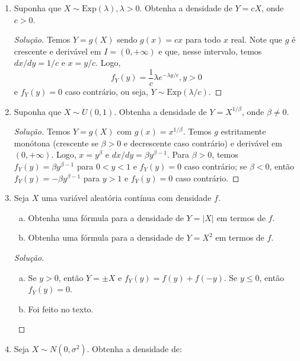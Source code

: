 \documentclass[../Notas.tex]{subfiles}
\begin{document}
\begin{enumerate}
\begin{proof}[Solução]
\begin{enumerate}[a)]
        \end{enumerate}
    \end{proof}
    \item Suponha que $X\sim\text{Exp}(\lambda), \lambda > 0$. Obtenha a densidade de $Y = cX$, onde $c > 0$.
    \begin{proof}[Solução]
        Temos $Y=g(X)$ sendo $g(x) = cx$ para todo $x$ real. Note que $g$ é crescente e derivável
        em $I = (0, +\infty)$ e que, nesse intervalo, temos $dx/dy = 1/c$ e $x = y/c$. Logo,
        \[
        f_Y(y) = \frac{1}{c}\lambda e^{-\lambda y/c}, y>0
        \]
        e $f_Y(y) = 0$ caso contrário, ou seja, $Y\sim\text{Exp}(\lambda/c)$.
    \end{proof}
    \item Suponha que $X\sim U(0, 1)$. Obtenha a densidade de $Y = X^{1/\beta}$, onde $\beta \neq 0$.
    \begin{proof}[Solução]
        Temos $Y=g(X)$ com $g(x) = x^{1/\beta}$. Temos $g$ estritamente monótona (crescente se $\beta>0$
        e decrescente caso contrário) e derivável em $(0, +\infty)$. Logo, $x = y^{\beta}$ e 
        $dx/dy = \beta y^{\beta-1}$. Para $\beta > 0$, temos $f_Y(y) = \beta y^{\beta - 1}$ para
        $0<y<1$ e $f_Y(y) = 0$ caso contrário; se $\beta < 0$, então $f_Y(y) = -\beta y^{\beta - 1}$
        para $y>1$ e $f_Y(y) = 0$ caso contrário.
    \end{proof}
    \item Seja $X$ uma variável aleatória contínua com densidade $f$.
    \begin{enumerate}[a)]
    \item Obtenha uma fórmula para a densidade de $Y = |X|$ em termos de $f$.
    \item Obtenha uma fórmula para a densidade de $Y = X^2$ em termos de $f$.
    \end{enumerate}
    \begin{proof}[Solução]
        \begin{enumerate}[a)]
            \item Se $y>0$, então $Y=\pm X$ e $f_Y(y) = f(y) + f(-y)$. Se $y\leq 0$, então 
            $f_Y(y) = 0$.
            \item Foi feito no texto.
        \end{enumerate}
    \end{proof}
    \item Seja $X\sim N(0,\sigma^2)$. Obtenha a densidade de:
    \begin{enumerate}[a)]

\end{enumerate}
\end{enumerate}
\end{document}
